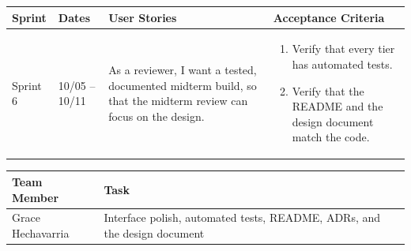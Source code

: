 \documentclass[12pt]{article}
\begin{document}
\noindent\begin{minipage}{\linewidth}

\vspace{0.5em}
\noindent
\begin{tabular}{|L{1.2cm}|L{1.8cm}|L{5.2cm}|L{6.3cm}|}
\hline
\textbf{Sprint} & \textbf{Dates} & \textbf{User Stories} & \textbf{Acceptance Criteria} \\
\hline
Sprint 6 & 10/05 -- 10/11 &
As a reviewer, I want a tested, documented midterm build, so that the midterm review can focus on the design. &
\begin{enumerate}
    \item Verify that every tier has automated tests.
    \item Verify that the README and the design document match the code.
\end{enumerate} \\
\hline
\end{tabular}

\vspace{0.5em}
\noindent
\begin{tabular}{|L{3.4cm}|L{11.6cm}|}
\hline
\textbf{Team Member} & \textbf{Task} \\
\hline
Grace Hechavarria & Interface polish, automated tests, README, ADRs, and the design document \\
\hline
\end{tabular}
\end{minipage}

\vspace{1.5em}
\end{document}
